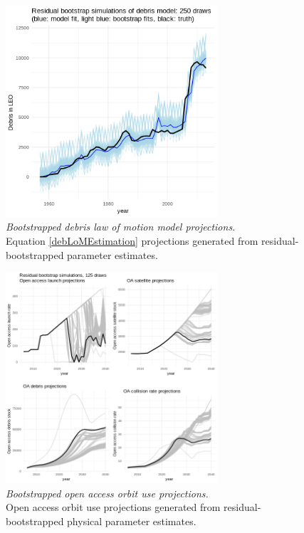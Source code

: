\documentclass[12pt]{article}
\begin{document}
\begin{figure}[H]
	\centering
	\includegraphics[width=0.7\textwidth]{../../images/debris_bootstrap_prediction_plot.png}
	\captionsetup{format=hang}
	\caption[Bootstrapped debris law of motion model projections]{\textit{Bootstrapped debris law of motion model projections.} \\
		Equation \ref{debLoMEstimation} projections generated from residual-bootstrapped parameter estimates.
	}
	\label{debris_eqn_prediction_bootstrap}
\end{figure}

\begin{figure}[H]
	\centering
	\includegraphics[width=0.7\textwidth]{../../images/bootstrapped_openaccess_simulation_plot.png}
	\captionsetup{format=hang}
	\caption[Bootstrapped open access orbit use projections]{\textit{Bootstrapped open access orbit use projections.} \\
		Open access orbit use projections generated from residual-bootstrapped physical parameter estimates.
	}
	\label{open_access_projection_bootstrap}
\end{figure}
\end{document}
